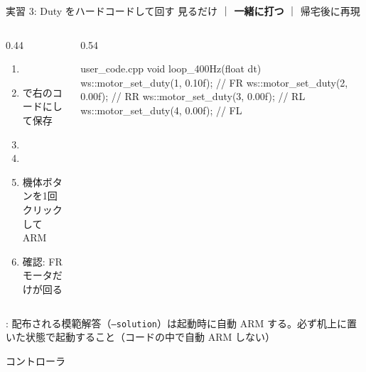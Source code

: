 \begin{frame}[fragile]{実習 3: Duty をハードコードして回す}
  \vspace{0.15em}
  {\small 見るだけ ｜ \textcolor{sfblue}{\textbf{一緒に打つ}} ｜ 帰宅後に再現}
  \vspace{0.15em}

  \begin{columns}[T]
    \begin{column}{0.44\textwidth}
      \footnotesize
      \begin{enumerate}\setlength{\itemsep}{1pt}
        \item {}
        \item {} で右のコードにして保存
        \item {}
        \item {}
        \item 機体ボタンを1回クリックして ARM
        \item 確認: FR モータだけが回る
      \end{enumerate}
    \end{column}
    \begin{column}{0.54\textwidth}
      \begin{sflisting}[basicstyle=\ttfamily\scriptsize]{user\_code.cpp}
void loop_400Hz(float dt) {
    ws::motor_set_duty(1, 0.10f);   // FR
    ws::motor_set_duty(2, 0.00f);   // RR
    ws::motor_set_duty(3, 0.00f);   // RL
    ws::motor_set_duty(4, 0.00f);   // FL
}
      \end{sflisting}
    \end{column}
  \end{columns}

  \vspace{0.15em}

  {\footnotesize {}: 配布される模範解答（\texttt{--solution}）は起動時に自動 ARM する。必ず机上に置いた状態で起動すること（コードの中で自動 ARM しない）}
\end{frame}

\begin{frame}{コントローラ}
  \begin{center}
  \end{center}
\end{frame}

